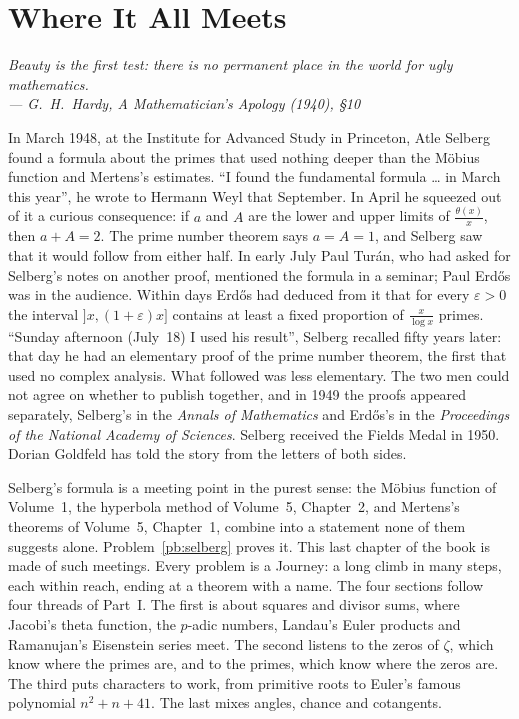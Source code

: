 \chapter{Where It All Meets}

\begin{center}\itshape
Beauty is the first test: there is no permanent place in the world for ugly mathematics.\\
\upshape --- G.~H.~Hardy, \emph{A Mathematician's Apology} (1940), \S10
\end{center}

In March 1948, at the Institute for Advanced Study in Princeton, Atle Selberg found a formula about the primes that used nothing deeper than the
Möbius function and Mertens's estimates. ``I found the fundamental formula \dots{} in March this year'', he wrote to Hermann Weyl that September. In April he
squeezed out of it a curious consequence: if $a$ and $A$ are the lower and upper limits of $\frac{\theta(x)}x$, then $a+A=2$. The prime number theorem says
$a=A=1$, and Selberg saw that it would follow from either half. In early July Paul Turán, who had asked for Selberg's notes on another proof, mentioned the formula in
a seminar; Paul Erd\H{o}s was in the audience. Within days Erd\H{o}s had deduced from it that for every $\varepsilon>0$ the interval $]x,(1+\varepsilon)x]$ contains
at least a fixed proportion of $\frac x{\log x}$ primes. ``Sunday afternoon (July~18) I used his result'', Selberg recalled fifty years later: that day he had
an elementary proof of the prime number theorem, the first that used no complex analysis. What followed was less elementary. The two men
could not agree on whether to publish together, and in 1949 the proofs appeared separately, Selberg's in the \emph{Annals of Mathematics} and
Erd\H{o}s's in the \emph{Proceedings of the National Academy of Sciences}. Selberg received the Fields Medal in 1950. Dorian Goldfeld has told the story from the
letters of both sides.

Selberg's formula is a meeting point in the purest sense: the Möbius function of Volume~1, the hyperbola method of Volume~5, Chapter~2, and Mertens's theorems of Volume~5,
Chapter~1, combine into a statement none of them suggests alone. Problem~\ref{pb:selberg} proves it. This last chapter of the book is made of such meetings. Every problem
is a Journey: a long climb in many steps, each within reach, ending at a theorem with a name. The four sections follow four threads of Part~I. The first is about
squares and divisor sums, where Jacobi's theta function, the $p$-adic numbers, Landau's Euler products and Ramanujan's Eisenstein series meet. The second listens to the zeros of $\zeta$,
which know where the primes are, and to the primes, which know where the zeros are. The third puts characters to work, from primitive roots to Euler's famous
polynomial $n^2+n+41$. The last mixes angles, chance and cotangents.

